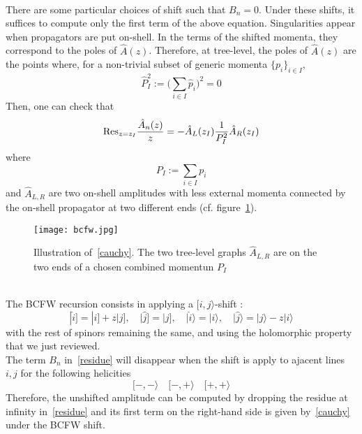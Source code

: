 \\
There are some particular choices of shift such that $B_n = 0$.
Under these shifts, it suffices to compute only the first term of the above equation. 
Singularities appear when propagators are put on-shell. 
In the terms of the shifted momenta, they correspond to the poles of $\hat{A}(z)$.
Therefore, at tree-level, the poles of $\hat{A}(z)$ are the points where, for a non-trivial subset of generic momenta $\{p_i\}_{i\in I}$, 
\begin{equation*}
\hat{P}_I^2 := \big( \sum_{i\in I} \hat{p}_i \big)^2 = 0
\end{equation*}   
%
Then, one can check that
\begin{equation}\label{cauchy}
\mathrm{Res}_{z=z_I}\frac{\hat{A}_n(z)}{z} = - \hat{A}_L(z_I)\frac{1}{P_I^2}\hat{A}_R(z_I)
\end{equation}
where 
\begin{equation*}
P_I := \sum_{i\in I}p_i
\end{equation*}
and $\hat{A}_{L,R}$ are two on-shell amplitudes with less external momenta connected by the on-shell propagator at two different ends (cf. figure~\ref{fig_cauchy}).
\begin{figure}[h]
  \centering
  \texttt{[image: bcfw.jpg]}
  \caption{Illustration of~\cref{cauchy}. The two tree-level graphs $\hat{A}_{L,R}$ are on the two ends of a chosen combined momentun $P_I$}
  \label{fig_cauchy}
\end{figure}
\\
The BCFW recursion consists in applying a $[i,j\rangle$-shift :
\begin{equation}
|\hat{i}] = |i] + z |j], \quad |\hat{j}] = |j], \quad|\hat{i}\rangle = |i\rangle, \quad |\hat{j}\rangle = |j\rangle - z|i\rangle
\end{equation}  
with the rest of spinors remaining the same, 
and using the holomorphic property that we just reviewed.
\\
The term $B_n$ in~\cref{residue} will disappear when the shift is apply to ajacent lines $i,j$ for the following helicities~\cite{ArkaniHamed:2008yf}
\begin{equation*}
[-,-\rangle \quad [-,+\rangle \quad [+,+\rangle
\end{equation*}
Therefore, the unshifted amplitude can be computed by dropping the residue at infinity in~\cref{residue} and its first term on the right-hand side is given by~\cref{cauchy} under the BCFW shift.
%
